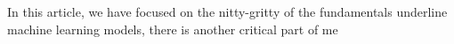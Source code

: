 In this article, we have focused on the nitty-gritty of the fundamentals underline machine learning models, there is another critical part of me 
